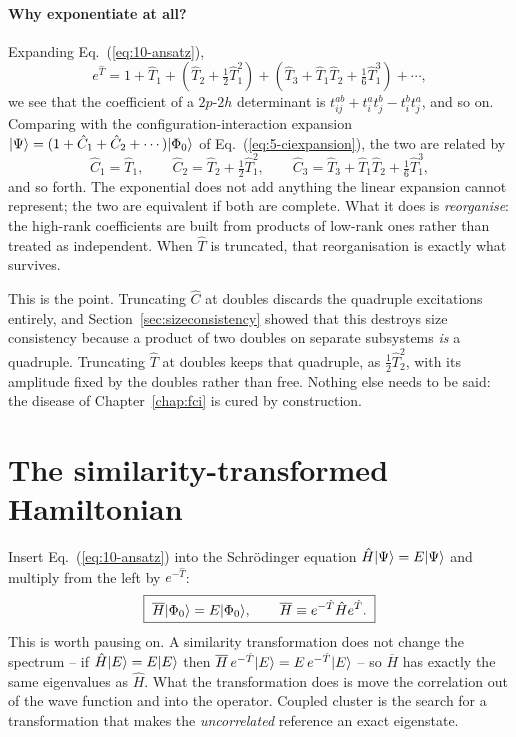 \paragraph{Why exponentiate at all?}
Expanding Eq.~(\ref{eq:10-ansatz}),
\begin{equation}
  e^{\hat{T}} = 1 + \hat{T}_1 + \left(\hat{T}_2
    + \tfrac12\hat{T}_1^2\right)
    + \left(\hat{T}_3 + \hat{T}_1\hat{T}_2
      + \tfrac16\hat{T}_1^3\right) + \cdots,
  \label{eq:10-expansion}
\end{equation}
we see that the coefficient of a $2p$-$2h$ determinant is
$t_{ij}^{ab}+t_i^at_j^b-t_i^bt_j^a$, and so on.  Comparing with the
configuration-interaction expansion
$\vert \Psi \rangle=(1+\hat{C}_1+\hat{C}_2+\cdots)\vert \Phi_0 \rangle$ of
Eq.~(\ref{eq:5-ciexpansion}), the two are related by
\begin{equation}
  \hat{C}_1 = \hat{T}_1,
  \qquad
  \hat{C}_2 = \hat{T}_2 + \tfrac12\hat{T}_1^2,
  \qquad
  \hat{C}_3 = \hat{T}_3 + \hat{T}_1\hat{T}_2 + \tfrac16\hat{T}_1^3,
  \label{eq:10-CtoT}
\end{equation}
and so forth.  The exponential does not add anything the linear expansion
cannot represent; the two are equivalent if both are complete.  What it does
is \emph{reorganise}: the high-rank coefficients are built from products of
low-rank ones rather than treated as independent.  When $\hat{T}$ is
truncated, that reorganisation is exactly what survives.

This is the point.  Truncating $\hat{C}$ at doubles discards the quadruple
excitations entirely, and Section~\ref{sec:sizeconsistency} showed that this
destroys size consistency because a product of two doubles on separate
subsystems \emph{is} a quadruple.  Truncating $\hat{T}$ at doubles keeps that
quadruple, as $\tfrac12\hat{T}_2^2$, with its amplitude fixed by the doubles
rather than free.  Nothing else needs to be said: the disease of
Chapter~\ref{chap:fci} is cured by construction.

\section{The similarity-transformed Hamiltonian}
\label{sec:similaritytransform}

Insert Eq.~(\ref{eq:10-ansatz}) into the Schr\"odinger equation
$\hat{H}\vert \Psi \rangle=E\vert \Psi \rangle$ and multiply from the left by
$e^{-\hat{T}}$:
\begin{equation}
  \boxed{\;
  \overline{H}\vert \Phi_0 \rangle = E\vert \Phi_0 \rangle,
  \qquad
  \overline{H} \equiv e^{-\hat{T}}\hat{H}e^{\hat{T}} .
  \;}
  \label{eq:10-transformed}
\end{equation}
This is worth pausing on.  A similarity transformation does not change the
spectrum -- if $\hat{H}\vert E \rangle=E\vert E \rangle$ then
$\overline{H}\,e^{-\hat{T}}\vert E \rangle=E\,e^{-\hat{T}}\vert E \rangle$ -- so
$\overline{H}$ has exactly the same eigenvalues as $\hat{H}$.  What the
transformation does is move the correlation out of the wave function and into
the operator.  Coupled cluster is the search for a transformation that makes
the \emph{uncorrelated} reference an exact eigenstate.

